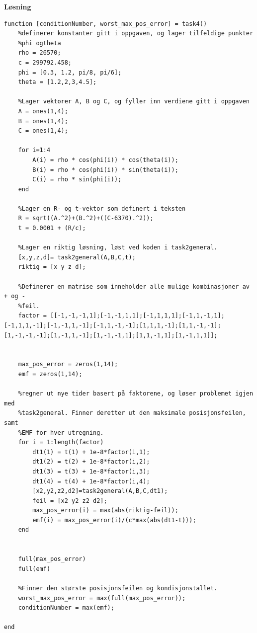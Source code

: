 \textbf{Løsning}

\begin{lstlisting}[caption={task4.m},label=lst:task4.m]
function [conditionNumber, worst_max_pos_error] = task4()
	%definerer konstanter gitt i oppgaven, og lager tilfeldige punkter 
	%phi ogtheta
	rho = 26570;
	c = 299792.458;
	phi = [0.3, 1.2, pi/8, pi/6];
	theta = [1.2,2,3,4.5];

	%Lager vektorer A, B og C, og fyller inn verdiene gitt i oppgaven
	A = ones(1,4); 
	B = ones(1,4); 
	C = ones(1,4);

	for i=1:4
	    A(i) = rho * cos(phi(i)) * cos(theta(i));
	    B(i) = rho * cos(phi(i)) * sin(theta(i));
	    C(i) = rho * sin(phi(i));
	end

	%Lager en R- og t-vektor som definert i teksten
	R = sqrt((A.^2)+(B.^2)+((C-6370).^2));
	t = 0.0001 + (R/c);

	%Lager en riktig løsning, løst ved koden i task2general. 
	[x,y,z,d]= task2general(A,B,C,t); 
	riktig = [x y z d];

	%Definerer en matrise som inneholder alle mulige kombinasjoner av + og -
	%feil. 
	factor = [[-1,-1,-1,1];[-1,-1,1,1];[-1,1,1,1];[-1,1,-1,1];[-1,1,1,-1];[-1,-1,1,-1];[-1,1,-1,-1];[1,1,1,-1];[1,1,-1,-1];[1,-1,-1,-1];[1,-1,1,-1];[1,-1,-1,1];[1,1,-1,1];[1,-1,1,1]];


	max_pos_error = zeros(1,14);
	emf = zeros(1,14);

	%regner ut nye tider basert på faktorene, og løser problemet igjen med
	%task2general. Finner deretter ut den maksimale posisjonsfeilen, samt 
	%EMF for hver utregning.
	for i = 1:length(factor)
	    dt1(1) = t(1) + 1e-8*factor(i,1);
	    dt1(2) = t(2) + 1e-8*factor(i,2);
	    dt1(3) = t(3) + 1e-8*factor(i,3);
	    dt1(4) = t(4) + 1e-8*factor(i,4); 
	    [x2,y2,z2,d2]=task2general(A,B,C,dt1);
	    feil = [x2 y2 z2 d2];
	    max_pos_error(i) = max(abs(riktig-feil));
	    emf(i) = max_pos_error(i)/(c*max(abs(dt1-t)));
	end


	full(max_pos_error)
	full(emf)

	%Finner den største posisjonsfeilen og kondisjonstallet.
	worst_max_pos_error = max(full(max_pos_error));
	conditionNumber = max(emf);

end
\end{lstlisting}


